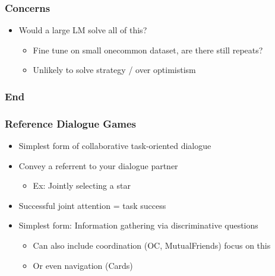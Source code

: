 \documentclass{beamer}
\begin{document}
\begin{frame}
\frametitle{Concerns}
\begin{itemize}
\item Would a large LM solve all of this?
    \begin{itemize}
    \item Fine tune on small onecommon dataset, are there still repeats?
    \item Unlikely to solve strategy / over optimistism
    \end{itemize}
\end{itemize}
\end{frame}

\begin{frame}
\frametitle{End}
\end{frame}

\begin{frame}
\frametitle{Reference Dialogue Games}
\begin{itemize}
\item Simplest form of collaborative task-oriented dialogue
\item Convey a referrent to your dialogue partner
    \begin{itemize}
    \item Ex: Jointly selecting a star
    \end{itemize}
\item Successful joint attention = task success

\item Simplest form: Information gathering via discriminative questions
    \begin{itemize}
    \item Can also include coordination (OC, MutualFriends) focus on this
    \item Or even navigation (Cards)
    \end{itemize}

\end{itemize}
\end{frame}
\end{document}
